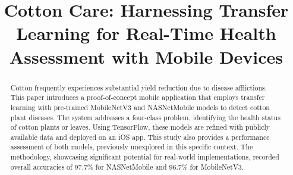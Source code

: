 \documentclass[conference]{IEEEtran}
\begin{document}
\title{Cotton Care: Harnessing Transfer Learning for Real-Time Health Assessment with Mobile Devices\\}

\makeatletter
\newcommand{\linebreakand}{%
  \end{@IEEEauthorhalign}
  \hfill\mbox{}\par
  \mbox{}\hfill\begin{@IEEEauthorhalign}
}
\makeatother

\author{
\and
{}
\and
{}
}

\maketitle

\begin{abstract}
Cotton frequently experiences substantial yield reduction due to disease afflictions. This paper introduces a proof-of-concept mobile application that employs transfer learning with pre-trained MobileNetV3 and NASNetMobile models to detect cotton plant diseases. The system addresses a four-class problem, identifying the health status of cotton plants or leaves. Using TensorFlow, these models are refined with publicly available data and deployed on an iOS app. This study also provides a performance assessment of both models, previously unexplored in this specific context. The methodology, showcasing significant potential for real-world implementations, recorded overall accuracies of 97.7\% for NASNetMobile and 96.7\% for MobileNetV3.
\end{abstract}
\end{document}
